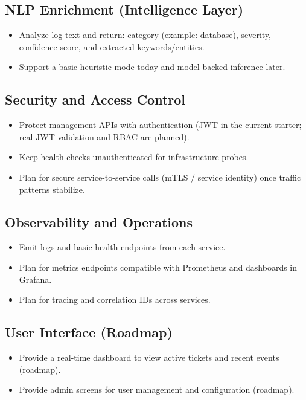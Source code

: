 \subsection{NLP Enrichment (Intelligence Layer)}
\begin{itemize}
  \item Analyze log text and return: category (example: database), severity, confidence score, and extracted keywords/entities.
  \item Support a basic heuristic mode today and model-backed inference later.
\end{itemize}

\subsection{Security and Access Control}
\begin{itemize}
  \item Protect management APIs with authentication (JWT in the current starter; real JWT validation and RBAC are planned).
  \item Keep health checks unauthenticated for infrastructure probes.
  \item Plan for secure service-to-service calls (mTLS / service identity) once traffic patterns stabilize.
\end{itemize}

\subsection{Observability and Operations}
\begin{itemize}
  \item Emit logs and basic health endpoints from each service.
  \item Plan for metrics endpoints compatible with Prometheus and dashboards in Grafana.
  \item Plan for tracing and correlation IDs across services.
\end{itemize}

\subsection{User Interface (Roadmap)}
\begin{itemize}
  \item Provide a real-time dashboard to view active tickets and recent events (roadmap).
  \item Provide admin screens for user management and configuration (roadmap).
\end{itemize}


